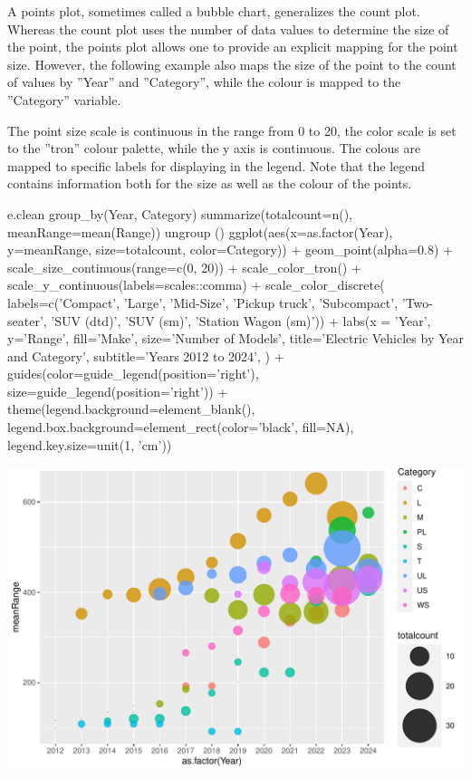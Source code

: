 A points plot, sometimes called a bubble chart, generalizes the count plot. Whereas the count plot uses the number of data values to determine the size of the point, the points plot allows one to provide an explicit mapping for the point size. However, the following example also maps the size of the point to the count of values by ''Year'' and ''Category'', while the colour is mapped to the ''Category'' variable. 

The point size scale is continuous in the range from 0 to 20, the color scale is set to the ''tron'' colour palette, while the y axis is continuous. The colous are mapped to specific labels for displaying in the legend. Note that the legend contains information both for the size as well as the colour of the points.

\begin{samepage}
\begin{Rcode}
e.clean %
  group_by(Year, Category) %
  summarize(totalcount=n(), meanRange=mean(Range)) %
  ungroup () %
ggplot(aes(x=as.factor(Year), y=meanRange, 
           size=totalcount, color=Category)) +
  geom_point(alpha=0.8) +
  scale_size_continuous(range=c(0, 20)) +
  scale_color_tron() + 
  scale_y_continuous(labels=scales::comma) + 
  scale_color_discrete(
     labels=c('Compact', 'Large', 'Mid-Size', 'Pickup truck', 
              'Subcompact', 'Two-seater', 'SUV (dtd)', 
              'SUV (sm)', 'Station Wagon (sm)')) + 
  labs(x = 'Year', y='Range', 
       fill='Make', size='Number of Models', 
       title='Electric Vehicles by Year and Category', 
       subtitle='Years 2012 to 2024', ) +
  guides(color=guide_legend(position='right'), 
         size=guide_legend(position='right')) +
  theme(legend.background=element_blank(), 
        legend.box.background=element_rect(color='black', fill=NA),
        legend.key.size=unit(1, 'cm')) 
\end{Rcode}
\end{samepage}

\begin{center}
  \includegraphics[width=.8\textwidth]{fuel.pointsSize.pdf}
\end{center}

